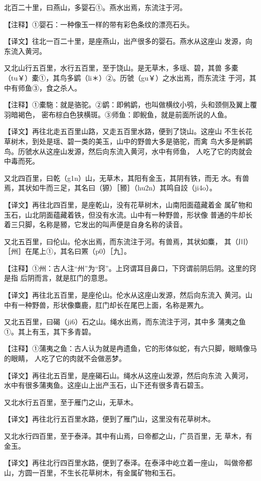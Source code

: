 \documentclass[a4paper,12pt,UTF8,twoside]{ctexbook}
\begin{document}
北百二十里，曰燕山，多婴石①。燕水出焉，东流注于河。

【注释】①婴石：一种像玉一样的带有彩色条纹的漂亮石头。

【译文】往北一百二十里，是座燕山，出产很多的婴石。燕水从这座山 发源，向东流入黄河。

又北山行五百里，水行五百里，至于饶山。是无草木，多瑶、碧，其兽 多橐（tu￥）橐①，其鸟多鹠（li＊）②。历虢（gu￥）之水出焉，而东流注 于河，其中有师鱼③，食之杀人。

【注释】①橐駞：就是骆驼。②鹠：即鸺鹠，也叫做横纹小鸮，头和颈侧及翼上覆羽暗褐色， 密布棕白色狭横斑。③师鱼：即鲵鱼，就是前面所说的人鱼。

【译文】再往北走五百里山路，又走五百里水路，便到了饶山。这座山 不生长花草树木，到处是瑶、碧一类的美玉，山中的野兽大多是骆驼，而禽 鸟大多是鸺鹠鸟。历虢水从这座山发源，然后向东流入黄河，水中有师鱼， 人吃了它的肉就会中毒而死。

又北四百里，曰乾（g1n）山，无草木，其阳有金玉，其阴有铁，而无 水。有兽焉，其状如牛而三足，其名曰（獂）［豲］（hu2n）其鸣自詨（ji4o）。

【译文】再往北四百里，是座乾山，没有花草树木，山南阳面蕴藏着金 属矿物和玉石，山北阴面蕴藏着铁，但没有水流。山中有一种野兽，形状像 普通的牛却长着三只脚，名称是豲，它发出的叫声便是自身名称的读音。

又北五百里，曰伦山。伦水出焉，而东流注于河。有兽焉，其状如麋， 其（川）［州］在尾上①，其名曰罴（p0）［九］。

【注释】①州：古人注“州”为“窍”。上窍谓耳目鼻口，下窍谓前阴后阴。这里的窍是指 后阴而言，就是肛门的意思。

【译文】再往北五百里，是座伦山。伦水从这座山发源，然后向东流入 黄河。山中有一种野兽，形状像麋鹿，肛门却长在尾巴上面，名称是罴九。

又北五百里，曰碣（ji6）石之山。绳水出焉，而东流注于河，其中多 蒲夷之鱼①。其上有玉，其下多青碧。

【注释】①蒲夷之鱼：古人认为就是冉遗鱼，它的形体似蛇，有六只脚，眼睛像马的眼睛， 人吃了它的肉就不会做恶梦。

【译文】再往北五百里，是座碣石山。绳水从这座山发源，然后向东流 入黄河，水中有很多蒲夷鱼。这座山上出产玉石，山下还有很多青石碧玉。

又北水行五百里，至于雁门之山，无草木。

【译文】再往北行五百里水路，便到了雁门山，这里没有花草树木。

又北水行四百里，至于泰泽。其中有山焉，曰帝都之山，广员百里，无 草木，有金玉。

【译文】再往北行四百里水路，便到了泰泽。在泰泽中屹立着一座山， 叫做帝都山，方圆一百里，不生长花草树木，有金属矿物和玉石。
\end{document}
